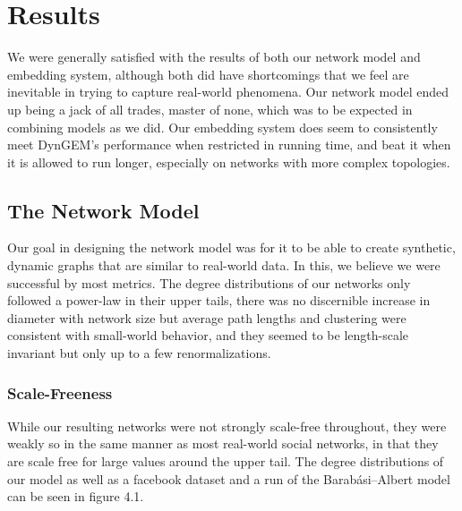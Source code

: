 \documentclass[12pt,twoside]{report}
\begin{document}
\chapter{Results}

We were generally satisfied with the results of both our network model and embedding system, although both did have shortcomings that we feel are inevitable in trying to capture real-world phenomena. Our network model ended up being a jack of all trades, master of none, which was to be expected in combining models as we did. Our embedding system does seem to consistently meet DynGEM's performance when restricted in running time, and beat it when it is allowed to run longer, especially on networks with more complex  topologies. \\ 

\section{The Network Model}

Our goal in designing the network model was for it to be able to create synthetic, dynamic graphs that are similar to real-world data. In this, we believe we were successful by most metrics. The degree distributions of our networks only followed a power-law in their upper tails, there was no discernible increase in diameter with network size but average path lengths and clustering were consistent with small-world behavior, and they seemed to be length-scale invariant but only up to a few renormalizations. \\

\subsection{Scale-Freeness}

While our resulting networks were not strongly scale-free throughout, they were weakly so in the same manner as most real-world social networks, in that they are scale free for large values around the upper tail. The degree distributions of our model as well as a facebook dataset and a run of the Barabási–Albert model can be seen in figure 4.1. \\
\end{document}
